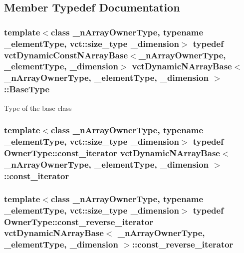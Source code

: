 \subsection{Member Typedef Documentation}
\hypertarget{classvct_dynamic_n_array_base_ac2c95af53fa85b36f67bdc9ffe0d1737}{}
\subsubsection[{Base\+Type}]{\setlength{\rightskip}{0pt plus 5cm}template$<$class \+\_\+n\+Array\+Owner\+Type, typename \+\_\+element\+Type, vct\+::size\+\_\+type \+\_\+dimension$>$ typedef {\bf vct\+Dynamic\+Const\+N\+Array\+Base}$<$\+\_\+n\+Array\+Owner\+Type, \+\_\+element\+Type, \+\_\+dimension$>$ {\bf vct\+Dynamic\+N\+Array\+Base}$<$ \+\_\+n\+Array\+Owner\+Type, \+\_\+element\+Type, \+\_\+dimension $>$\+::{\bf Base\+Type}}\label{classvct_dynamic_n_array_base_ac2c95af53fa85b36f67bdc9ffe0d1737}
Type of the base class \hypertarget{classvct_dynamic_n_array_base_a77193963c2949409a70d820f87ba9ddb}{}
\subsubsection[{const\+\_\+iterator}]{\setlength{\rightskip}{0pt plus 5cm}template$<$class \+\_\+n\+Array\+Owner\+Type, typename \+\_\+element\+Type, vct\+::size\+\_\+type \+\_\+dimension$>$ typedef Owner\+Type\+::const\+\_\+iterator {\bf vct\+Dynamic\+N\+Array\+Base}$<$ \+\_\+n\+Array\+Owner\+Type, \+\_\+element\+Type, \+\_\+dimension $>$\+::{\bf const\+\_\+iterator}}\label{classvct_dynamic_n_array_base_a77193963c2949409a70d820f87ba9ddb}
\hypertarget{classvct_dynamic_n_array_base_a63dd44f3924be6ea9240772286f7bfd2}{}
\subsubsection[{const\+\_\+reverse\+\_\+iterator}]{\setlength{\rightskip}{0pt plus 5cm}template$<$class \+\_\+n\+Array\+Owner\+Type, typename \+\_\+element\+Type, vct\+::size\+\_\+type \+\_\+dimension$>$ typedef Owner\+Type\+::const\+\_\+reverse\+\_\+iterator {\bf vct\+Dynamic\+N\+Array\+Base}$<$ \+\_\+n\+Array\+Owner\+Type, \+\_\+element\+Type, \+\_\+dimension $>$\+::{\bf const\+\_\+reverse\+\_\+iterator}}\label{classvct_dynamic_n_array_base_a63dd44f3924be6ea9240772286f7bfd2}
\hypertarget{classvct_dynamic_n_array_base_a8e5f4edd6bbaaa0650c24f464a5c13b6}{}
